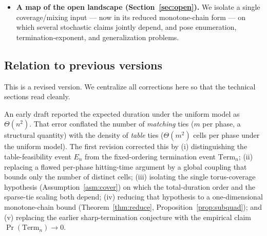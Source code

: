 \documentclass[11pt]{article}
\theoremstyle{definition}
\theoremstyle{remark}
\newcommand{\Term}{\mathrm{Term}}
\newcommand{\E}{\mathbb{E}}
\begin{document}
\begin{itemize}[leftmargin=1.4em]
confidence intervals shows $\Pr(\Term_n) \approx 0.79\, n^{-2.35}$ (refuting the earlier sharp-termination
conjecture, now Conjecture~\ref{conj:poly}); $E[V \mid \Term_n] \approx 2.9\,n$ (linear, as predicted); a \emph{decreasing}
indicator-weighted duration $\E[D_n\mathbf 1_{\Term_n}] \approx 0.75\,n^{-0.95}$; and consequently a super-linear
conditional duration $E[D_n \mid \Term_n] \approx 0.95\,n^{1.40}$ --- correcting the earlier $\Theta(n)$ conditional
claim, but \emph{not} the $n^2$ that a constant-weighted-duration heuristic would predict
(Section~\ref{sec:numerics}).
\item \textbf{A map of the open landscape (Section~\ref{sec:open}).} We isolate a single coverage/mixing input ---
now in its reduced monotone-chain form --- on which several stochastic claims jointly depend,
and pose enumeration, termination-exponent, and generalization problems.
\end{itemize}

\subsection{Relation to previous versions}\label{sec:relation}
This is a revised version. We centralize all corrections here so that the technical sections read cleanly.

An early draft reported the expected duration under the uniform model as $\Theta(n^2)$. That error conflated
the number of \emph{matching} ties ($m$ per phase, a structural quantity) with the density of \emph{table}
ties ($\Theta(m^2)$ cells per phase under the uniform model). The first revision corrected this by (i)
distinguishing the table-feasibility event $E_n$ from the fixed-ordering termination event $\Term_n$;
(ii) replacing a flawed per-phase hitting-time argument by a global coupling that bounds only the number of
distinct cells; (iii) isolating the single torus-coverage hypothesis (Assumption~\ref{asm:cover}) on which the
total-duration order and the sparse-tie scaling both depend; (iv) reducing that hypothesis to a one-dimensional
monotone-chain bound (Theorem~\ref{thm:reduce}, Proposition~\ref{prop:subquad}); and (v) replacing the earlier
sharp-termination conjecture with the empirical claim $\Pr(\Term_n)\to 0$.
\end{document}
